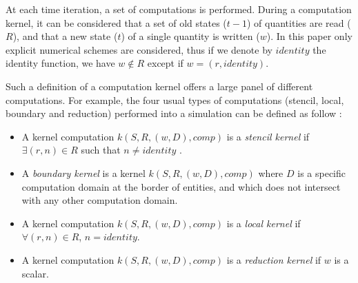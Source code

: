 At each time iteration, a set of computations is performed. During a computation kernel, it can be considered that a set of old states ($t-1$) of quantities are read ($R$), and that a new state ($t$) of a single quantity is written ($w$). In this paper only explicit numerical schemes are considered, thus if we denote by $identity$ the identity function, we have $w \not\in R$ except if $w=(r,identity)$.

Such a definition of a computation kernel offers a large panel of different computations. For example, the four usual types of computations (stencil, local, boundary and reduction) performed into a simulation can be defined as follow :
\begin{itemize}
\item A kernel computation $k(S,R,(w,D),comp)$ is a \emph{stencil kernel} if $\exists (r,n) \in R$ such that $n \neq identity$ .
\item A \emph{boundary kernel} is a kernel $k(S,R,(w,D),comp)$ where $D$ is a specific computation domain at the border of entities, and which does not intersect with any other computation domain.
\item A kernel computation $k(S,R,(w,D),comp)$ is a \emph{local kernel} if $\forall (r,n) \in R$, $n = identity$.
\item A kernel computation $k(S,R,(w,D),comp)$ is a \emph{reduction kernel} if $w$ is a scalar.%
\end{itemize}




